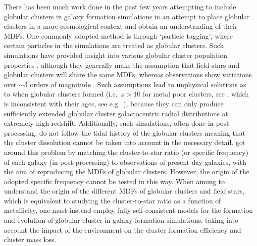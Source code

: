 \documentclass{aa}
\begin{document}
There has been much work done in the past few years attempting to include globular clusters in galaxy formation simulations in an attempt to place globular clusters in a more cosmological context and obtain an understanding of their MDFs.  One commonly adopted method is through `particle tagging', where certain particles in the simulations are treated as globular clusters.  Such simulations have provided insight into various globular cluster population properties \citep[e.g.][]{moore06,moran14}, although they generally make the assumption that field stars and globular clusters will share the same MDFs, whereas observations show variations over $\sim3$ orders of magnitude \citep[e.g.][]{kruijssen14c}.  Such assumptions lead to unphysical solutions as to when globular clusters formed (i.e.~$z>10$ for metal poor clusters, see \citealt{brodie06}, which is inconsistent with their ages, see e.g.~\citealt{forbes10}), because they can only produce sufficiently extended globular cluster galactocentric radial distributions at extremely high redshift.  Additionally, such simulations, often done in post-processing, do not follow the tidal history of the globular clusters meaning that the cluster dissolution cannot be taken into account in the necessary detail. \citet{tonini13} got around this problem by matching the cluster-to-star ratio (or specific frequency) of each galaxy (in post-processing) to observations of present-day galaxies, with the aim of reproducing the MDFs of globular clusters. However, the origin of the adopted specific frequency cannot be tested in this way. When aiming to understand the origin of the different MDFs of globular clusters and field stars, which is equivalent to studying the cluster-to-star ratio as a function of metallicity, one must instead employ fully self-consistent models for the formation and evolution of globular cluster in galaxy formation simulations, taking into account the impact of the environment on the cluster formation efficiency and cluster mass loss.
\end{document}
